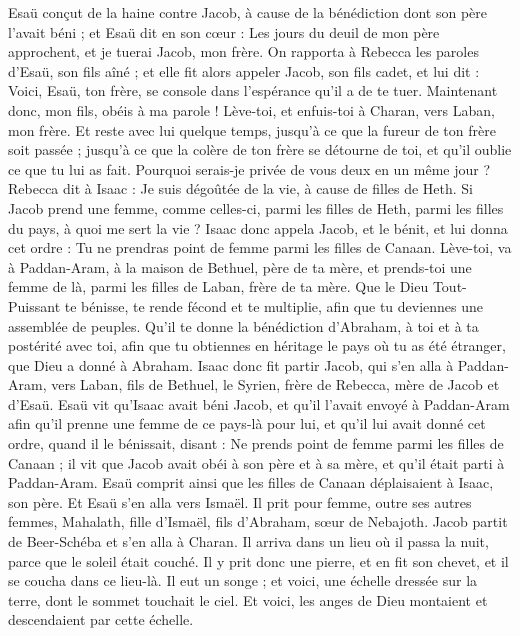 \begin{multicols}{2}
Esaü conçut de la haine contre Jacob, à cause de la bénédiction dont son père l'avait béni ; et Esaü dit en son cœur : Les jours du deuil de mon père approchent, et je tuerai Jacob, mon frère.
On rapporta à Rebecca les paroles d'Esaü, son fils aîné ; et elle fit alors appeler Jacob, son fils cadet, et lui dit : Voici, Esaü, ton frère, se console dans l'espérance qu'il a de te tuer.
Maintenant donc, mon fils, obéis à ma parole ! Lève-toi, et enfuis-toi à Charan, vers Laban, mon frère.
Et reste avec lui quelque temps, jusqu'à ce que la fureur de ton frère soit passée ;
jusqu’à ce que la colère de ton frère se détourne de toi, et qu'il oublie ce que tu lui as fait. Pourquoi serais-je privée de vous deux en un même jour ?
Rebecca dit à Isaac : Je suis dégoûtée de la vie, à cause de filles de Heth. Si Jacob prend une femme, comme celles-ci, parmi les filles de Heth, parmi les filles du pays, à quoi me sert la vie ?
\VerseOne{}Isaac donc appela Jacob, et le bénit, et lui donna cet ordre : Tu ne prendras point de femme parmi les filles de Canaan.
Lève-toi, va à Paddan-Aram, à la maison de Bethuel, père de ta mère, et prends-toi une femme de là, parmi les filles de Laban, frère de ta mère.
Que le Dieu Tout-Puissant te bénisse, te rende fécond et te multiplie, afin que tu deviennes une assemblée de peuples.
Qu’il te donne la bénédiction d'Abraham, à toi et à ta postérité avec toi, afin que tu obtiennes en héritage le pays où tu as été étranger, que Dieu a donné à Abraham.
Isaac donc fit partir Jacob, qui s'en alla à Paddan-Aram, vers Laban, fils de Bethuel, le Syrien, frère de Rebecca, mère de Jacob et d'Esaü.
Esaü vit qu'Isaac avait béni Jacob, et qu'il l'avait envoyé à Paddan-Aram afin qu'il prenne une femme de ce pays-là pour lui, et qu'il lui avait donné cet ordre, quand il le bénissait, disant : Ne prends point de femme parmi les filles de Canaan ;
il vit que Jacob avait obéi à son père et à sa mère, et qu’il était parti à Paddan-Aram.
Esaü comprit ainsi que les filles de Canaan déplaisaient à Isaac, son père.
Et Esaü s’en alla vers Ismaël. Il prit pour femme, outre ses autres femmes, Mahalath, fille d'Ismaël, fils d'Abraham, sœur de Nebajoth.
Jacob partit de Beer-Schéba et s'en alla à Charan.
Il arriva dans un lieu où il passa la nuit, parce que le soleil était couché. Il y prit donc une pierre, et en fit son chevet, et il se coucha dans ce lieu-là.
Il eut un songe ; et voici, une échelle dressée sur la terre, dont le sommet touchait le ciel. Et voici, les anges de Dieu montaient et descendaient par cette échelle.

\end{multicols}
